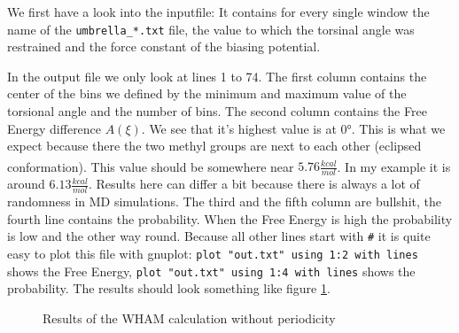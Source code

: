 \documentclass[a4paper,11pt]{scrartcl}
\newcommand{\myCite}[1]{\textsuperscript{\cite{#1}}}
\begin{document}
We first have a look into the inputfile: It contains for every single window the name of the \texttt{umbrella\_*.txt} file, the value to which the torsinal angle was restrained and the force constant of the biasing potential.

In the output file we only look at lines 1 to 74. The first column contains the center of the bins we defined by the minimum and maximum value of the torsional angle and the number of bins. The second column contains the Free Energy difference $A(\xi)$. We see that it's highest value is at 0°. This is what we expect because there the two methyl groups are next to each other (eclipsed conformation). This value should be somewhere near $5.76 \frac{kcal}{mol}$\myCite{becker_development_2015}. In my example it is around $6.13 \frac{kcal}{mol}$. Results here can differ a bit because there is always a lot of randomness in MD simulations. The third and the fifth column are bullshit, the fourth line contains the probability. When the Free Energy is high the probability is low and the other way round. Because all other lines start with \texttt{\#} it is quite easy to plot this file with gnuplot: \texttt{plot "out.txt" using 1:2 with lines} shows the Free Energy, \texttt{plot "out.txt" using 1:4 with lines} shows the probability. The results should look something like figure \ref{fig:wham_result}.

\begin{figure} [htb]
	\caption{Results of the WHAM calculation without periodicity}
	\label{fig:wham_result}
\end{figure} 
\end{document}
